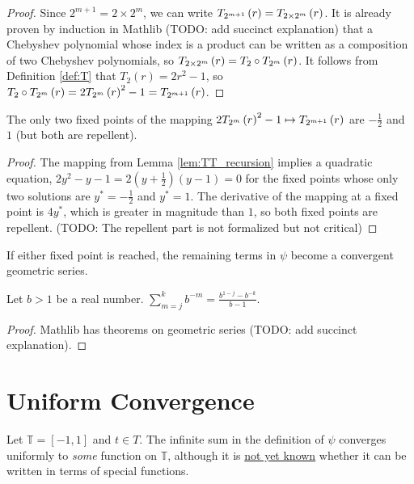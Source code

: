 \begin{proof}
  \leanok
  Since $2^{m + 1} = 2 \times 2^m$, we can write $T_{2^{m + 1}}\left(r\right) = T_{2 \times 2^m}\left(r\right)$. It is already proven by induction in Mathlib (TODO: add succinct explanation) that a Chebyshev polynomial whose index is a product can be written as a composition of two Chebyshev polynomials, so $T_{2 \times 2^m}\left(r\right) = T_2 \circ T_{2^{m}}\left(r\right)$. It follows from Definition \ref{def:T} that $T_2\left(r\right) = 2r^2 - 1$, so $T_2 \circ T_{2^{m}}\left(r\right) = 2T_{2^{m}}\left(r\right)^2 - 1 = T_{2^{m + 1}}\left(r\right)$.
\end{proof}

\begin{lemma}
  \label{lem:fixed_points}
  \leanok
  The only two fixed points of the mapping $2 T_{2^{m}}\left(r\right)^2 - 1 \mapsto T_{2^{m + 1}}\left(r\right)$ are $-\frac{1}{2}$ and $1$ (but both are repellent).
\end{lemma}

\begin{proof}
  \leanok
  The mapping from Lemma \ref{lem:TT_recursion} implies a quadratic equation, $2y^2 - y - 1 = 2\left(y + \frac{1}{2}\right)\left(y - 1\right) = 0$ for the fixed points whose only two solutions are $y^\ast = -\frac{1}{2}$ and $y^\ast = 1$. The derivative of the mapping at a fixed point is $4y^\ast$, which is greater in magnitude than $1$, so both fixed points are repellent. (TODO: The repellent part is not formalized but not critical)
\end{proof}
\noindent If either fixed point is reached, the remaining terms in $\psi$ become a convergent geometric series.
\begin{lemma}
  \label{lem:geometric}
  Let $b > 1$ be a real number. $\sum\limits_{m = j}^k b^{-m} = \frac{b^{1 - j} - b^{-k}}{b - 1}$.
\end{lemma}
\begin{proof}
  Mathlib has theorems on geometric series (TODO: add succinct explanation).
\end{proof}

\section{Uniform Convergence}\label{sec:UniformConvergence}

Let $\mathbb{T} = \left[-1,1\right]$ and $t \in T$. The infinite sum in the definition of $\psi$ converges uniformly to \emph{some} function on $\mathbb{T}$, although it is \underline{not yet known} whether it can be written in terms of special functions. 

